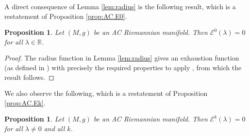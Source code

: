 \documentclass{article}
\newtheorem{prop}[thm]{Proposition}
\theoremstyle{definition}
\newtheorem{rmk}[thm]{Remark}
\numberwithin{thm}{section}
\numberwithin{equation}{section}
\def\R{\mathbb{R}}
\begin{document}

A direct consequence of Lemma \ref{lem:radius} is the following result, which is a restatement of Proposition \ref{prop:AC.E0}.

\begin{prop}\label{thm:noL^2.eigenfunctions}
Let $(M,g)$ be an AC Riemannian manifold.  Then $\mathcal{E}^0(\lambda)=0$ for all $\lambda\in\R$. 
\end{prop}

\begin{proof}  The radius function in Lemma \ref{lem:radius} gives an exhaustion function (as defined in \cite{Donnelly}) with precisely the required properties \cite[Properties 4.1]{Donnelly} to apply \cite[Corollary 5.3]{Donnelly}, from which the result follows.
\end{proof}

We also observe the following, which is a restatement of Proposition \ref{prop:AC.Ek}.

\begin{prop}\label{prop:noL^2.eigenforms.flat}
    Let $(M,g)$ be an AC Riemannian manifold.  Then $\mathcal{E}^k(\lambda)=0$ for all $\lambda\neq 0$ and all $k$. 
\end{prop}
\end{document}
